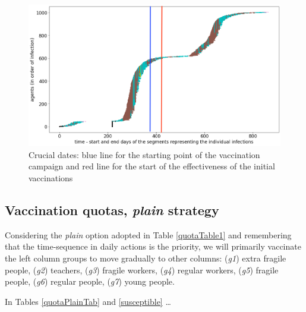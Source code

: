 \documentclass[graybox]{svmult}
\begin{document}
\begin{figure}[t]
\center
\includegraphics[scale=0.2]{CaseForGA_I_base.png}
\caption{Crucial dates: blue line for the starting point of the vaccination campaign and red line for the start of the effectiveness of the initial vaccinations}
\label{specificCaseGA}
\end{figure}


\subsection{Vaccination quotas, \emph{plain} strategy}
\label{plain}

Considering the \emph{plain} option adopted in Table \ref{quotaTable1} and remembering that the time-sequence in daily actions is the priority, we will primarily vaccinate the left column groups to move gradually to other columns: (\emph{g1}) extra fragile people, (\emph{g2}) teachers, (\emph{g3}) fragile workers, (\emph{g4}) regular workers, (\emph{g5}) fragile people, (\emph{g6}) regular people, (\emph{g7}) young people.

In Tables \ref{quotaPlainTab} and \ref{susceptible} \ldots
\end{document}
